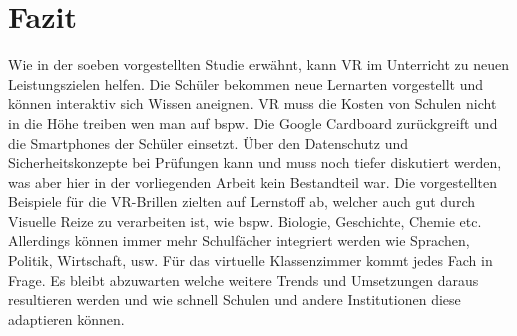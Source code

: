 \section{Fazit}
Wie in der soeben vorgestellten Studie erwähnt, kann VR im Unterricht zu neuen Leistungszielen helfen. Die Schüler bekommen neue Lernarten vorgestellt und können interaktiv sich Wissen aneignen. VR muss die Kosten von Schulen nicht in die Höhe treiben wen man auf bspw. Die Google Cardboard zurückgreift und die Smartphones der Schüler einsetzt. Über den Datenschutz und Sicherheitskonzepte bei Prüfungen kann und muss noch tiefer diskutiert werden, was aber hier in der vorliegenden Arbeit kein Bestandteil war. Die vorgestellten Beispiele für die VR-Brillen zielten auf Lernstoff ab, welcher auch gut durch Visuelle Reize zu verarbeiten ist, wie bspw. Biologie, Geschichte, Chemie etc. Allerdings können immer mehr Schulfächer integriert werden wie Sprachen, Politik, Wirtschaft, usw. Für das virtuelle Klassenzimmer kommt jedes Fach in Frage. 
Es bleibt abzuwarten welche weitere Trends und Umsetzungen daraus resultieren werden und wie schnell Schulen und andere Institutionen diese adaptieren können. 